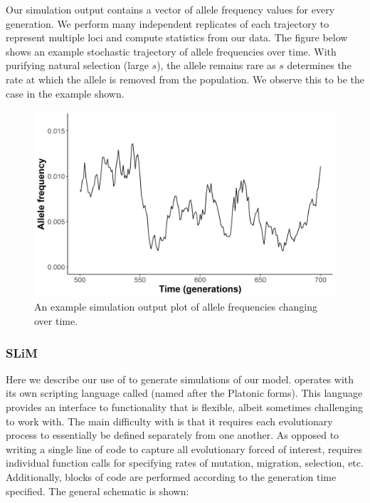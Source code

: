  

Our simulation output contains a vector of allele frequency values for every generation. We perform many independent replicates of each trajectory to represent multiple loci and compute statistics from our data. The figure below shows an example stochastic trajectory of allele frequencies over time. With purifying natural selection (large $s$), the allele remains rare as $s$ determines the rate at which the allele is removed from the population. We observe this to be the case in the example shown.


\begin{figure}[h]
    \centering
    \includegraphics[scale=0.5]{img/time_series.jpg}
    \caption{An example simulation output plot of allele frequencies changing over time.}
    \label{fig:time_series}
\end{figure}

\subsubsection{SLiM}

Here we describe our use of  to generate simulations of our model.  operates with its own scripting language called  (named after the Platonic forms). This language provides an interface to  functionality that is flexible, albeit sometimes challenging to work with. The main difficulty with  is that it requires each evolutionary process to essentially be defined separately from one another. As opposed to writing a single line of code to capture all evolutionary forced of interest,  requires individual function calls for specifying rates of mutation, migration, selection, etc. Additionally, blocks of code are performed according to the generation time specified. The general schematic is shown:


